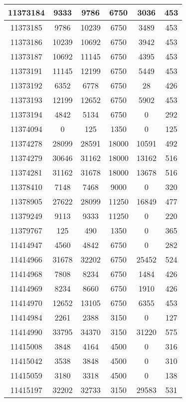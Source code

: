 \begin{appendices}
\begin{center}
\begin{longtable}{|c|c|c|c|c|c|}
11373184 & 9333  & 9786  & 6750  & 3036  & 453 \\ \hline
11373185 & 9786  & 10239 & 6750  & 3489  & 453 \\ \hline
11373186 & 10239 & 10692 & 6750  & 3942  & 453 \\ \hline
11373187 & 10692 & 11145 & 6750  & 4395  & 453 \\ \hline
11373191 & 11145 & 12199 & 6750  & 5449  & 453 \\ \hline
11373192 & 6352  & 6778  & 6750  & 28    & 426 \\ \hline
11373193 & 12199 & 12652 & 6750  & 5902  & 453 \\ \hline
11373194 & 4842  & 5134  & 6750  & 0     & 292 \\ \hline
11374094 & 0     & 125   & 1350  & 0     & 125 \\ \hline
11374278 & 28099 & 28591 & 18000 & 10591 & 492 \\ \hline
11374279 & 30646 & 31162 & 18000 & 13162 & 516 \\ \hline
11374281 & 31162 & 31678 & 18000 & 13678 & 516 \\ \hline
11378410 & 7148  & 7468  & 9000  & 0     & 320 \\ \hline
11378905 & 27622 & 28099 & 11250 & 16849 & 477 \\ \hline
11379249 & 9113  & 9333  & 11250 & 0     & 220 \\ \hline
11379767 & 125   & 490   & 1350  & 0     & 365 \\ \hline
11414947 & 4560  & 4842  & 6750  & 0     & 282 \\ \hline
11414966 & 31678 & 32202 & 6750  & 25452 & 524 \\ \hline
11414968 & 7808  & 8234  & 6750  & 1484  & 426 \\ \hline
11414969 & 8234  & 8660  & 6750  & 1910  & 426 \\ \hline
11414970 & 12652 & 13105 & 6750  & 6355  & 453 \\ \hline
11414984 & 2261  & 2388  & 3150  & 0     & 127 \\ \hline
11414990 & 33795 & 34370 & 3150  & 31220 & 575 \\ \hline
11415008 & 3848  & 4164  & 4500  & 0     & 316 \\ \hline
11415042 & 3538  & 3848  & 4500  & 0     & 310 \\ \hline
11415059 & 3180  & 3318  & 4500  & 0     & 138 \\ \hline
11415197 & 32202 & 32733 & 3150  & 29583 & 531 \\ \hline

\end{longtable}
\end{center}
\end{appendices}
